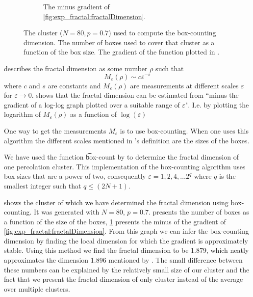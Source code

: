 \begin{figure}
\begin{subfigure}[t]{0.3\textwidth}
		\caption{The minus gradient of \cref{fig:exp_fractal:fractalDimension}.}
		\label{fig:exp_fractal:fractalDimensionGradient}
	\end{subfigure}		
	\caption{ The cluster ($N = 80, p = 0.7$) used to compute the box-counting dimension.  The number of boxes used to cover that cluster as a function of the box size.  The gradient of the function plotted in .}
	\label{fig:exp:dimension:plaatjes}
\end{figure}

\textcite{falconer2004fractal} describes the fractal dimension as some number $\rho$ such that
\begin{equation}
	M_\varepsilon(\rho) \sim c\varepsilon^{-s}
\end{equation}
where $c$ and $s$ are constants and $M_\varepsilon(\rho)$ are measurements at different scales $\varepsilon$ for $\varepsilon \to 0$. \citeauthor{falconer2004fractal} shows that the fractal dimension can be estimated from ``minus the gradient of a log-log graph plotted over a suitable range of $\varepsilon$". I.e. by plotting the logarithm of $M_\varepsilon(\rho)$ as a function of $\log(\varepsilon)$

One way to get the measurements $M_\varepsilon$ is to use box-counting. When one uses this algorithm the different scales mentioned in \citeauthor{falconer2004fractal}'s definition are the sizes of the boxes.

We have used the function \t{box-count} by \textcite{boxCounting} to determine the fractal dimension of one percolation cluster. This implementation of the box-counting algorithm uses box sizes that are a power of two, consequently $\varepsilon = 1, 2, 4, \dotsc 2^q$ where $q$ is the smallest integer such that $q \leq (2N + 1)$. 

 shows the cluster of which we have determined the fractal dimension using box-counting. It was generated with $N = 80$, $p = 0.7$.  presents the number of boxes as a function of the size of the boxes, \cref{fig:exp_fractal:fractalDimensionGradient} presents the minus of the gradient of \cref{fig:exp_fractal:fractalDimension}. From this graph we can infer the box-counting dimension by finding the local dimension for which the gradient is approximately stable. Using this method we find the fractal dimension to be \num{1.879}, which neatly approximates the dimension \num{1.896} mentioned by \textcite{stauffer1994introduction}. The small difference between these numbers can be explained by the relatively small size of our cluster and the fact that we present the fractal dimension of only cluster instead of the average over multiple clusters. 